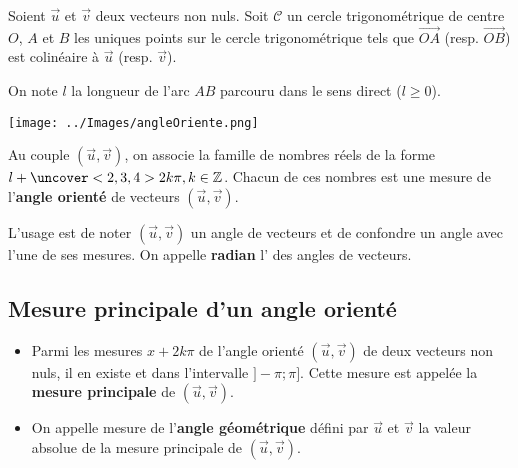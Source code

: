 \documentclass{beamer}
\theoremstyle{plain}
\begin{document}
  \begin{frame}
  
  Soient $\vec{u}$ et $\vec{v}$ deux vecteurs non nuls. Soit $\mathcal{C}$ un cercle trigonométrique de 
  centre $O$, $A$ et $B$ les uniques points sur le cercle trigonométrique tels que $\vec{OA}$ 
  (resp. $\vec{OB}$) est colinéaire à $\vec{u}$ (resp. $\vec{v}$).
 
 
  On note $l$ la longueur de l'arc $AB$ parcouru dans le sens direct ($l \geq 0$).

  \begin{center}
    \texttt{[image: ../Images/angleOriente.png]}
  \end{center}
  
\end{frame}

\begin{frame}
  \begin{definition}
  Au couple $(\vec{u},\vec{v})$, on associe la famille de nombres réels de la forme 
  $l+\uncover<2,3,4>{2k\pi}, k \in \mathbb{Z}$. Chacun de ces nombres est une mesure de l'\textbf{angle orienté}
   de vecteurs $(\vec{u},\vec{v})$.
   
   L'usage est de noter $(\vec{u},\vec{v})$ un angle de vecteurs et de confondre un angle avec l'une
   de ses mesures. On appelle \textbf{radian} l' des angles 
    de vecteurs.

  
  \end{definition}
       \end{frame}
       

\subsection{Mesure principale d'un angle orienté}
 
 \begin{frame}
 \begin{definition}
  \begin{itemize}
   \item Parmi les mesures $x+2k\pi$ de l'angle orienté $(\vec{u},\vec{v})$ de deux vecteurs non nuls,
   il en existe  et  dans l'intervalle $]-\pi;\pi]$.
   Cette mesure est appelée la \textbf{mesure 
   principale} de $(\vec{u},\vec{v})$.
   \item On appelle mesure de l'\textbf{angle géométrique} défini par $\vec{u}$ et $\vec{v}$ la valeur
   absolue de la mesure principale de $(\vec{u},\vec{v})$.
  \end{itemize}

 \end{definition}
 \end{frame}
\end{document}
